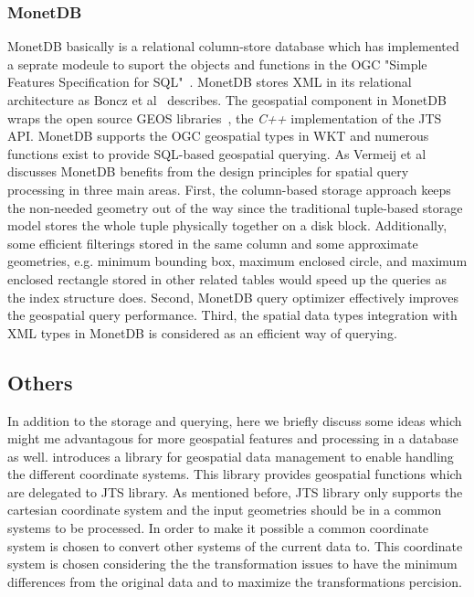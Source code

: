 \documentclass[a4paper,12pt]{article}
\begin{document}
\subsubsection{MonetDB}
MonetDB basically is a relational column-store database which has implemented a seprate modeule to suport the objects and functions in the OGC "Simple Features Specification for SQL"~\cite{ogc_sfs}. MonetDB stores XML in its relational architecture as Boncz et al~\cite{Boncz2006} describes. The geospatial component in MonetDB wraps the open source GEOS libraries~\cite{GEOS}, the \textit{C++} implementation of the JTS API. MonetDB supports the OGC geospatial types in WKT and numerous functions exist to provide SQL-based geospatial querying. As Vermeij et al~\cite{MonetDB} discusses MonetDB benefits from the design principles for spatial query processing in three main areas. First, the column-based storage approach keeps the non-needed geometry out of the way since the traditional tuple-based storage model stores the whole tuple physically together on a disk block. Additionally, some efficient filterings stored in the same column and some approximate geometries, e.g. minimum bounding box, maximum enclosed circle, and maximum enclosed rectangle stored in other related tables would speed up the queries as the index structure does. Second, MonetDB query optimizer effectively improves the geospatial query performance. Third, the spatial data types integration with XML types in MonetDB is considered as an efficient way of querying. 

\subsection{Others}
In addition to the storage and querying, here we briefly discuss some ideas which might me advantagous for more geospatial features and processing in a database as well. 
\cite{Schwarz2004} introduces a library for geospatial data management to enable handling the different coordinate systems. This library provides geospatial functions which are delegated to JTS library. As mentioned before, JTS library only supports the cartesian coordinate system and the input geometries should be in a common systems to be processed. In order to make it possible a common coordinate system is chosen to convert other systems of the current data to. This coordinate system is chosen considering the the transformation issues to have the minimum differences from the original data and to maximize the transformations percision.
\end{document}
